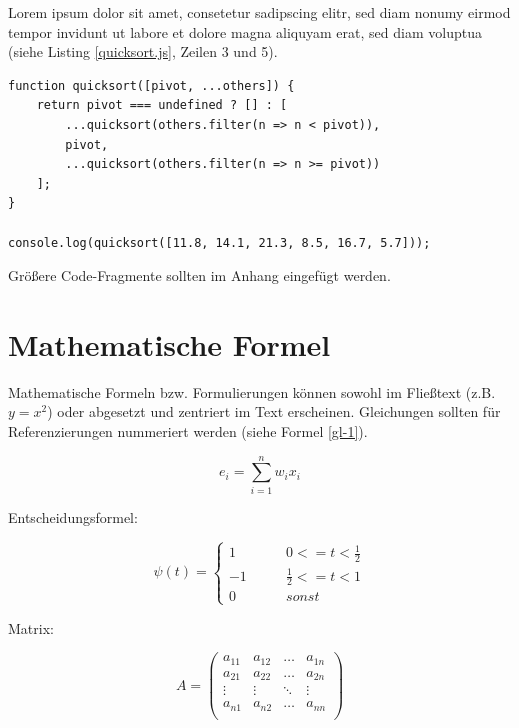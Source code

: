 Lorem ipsum dolor sit amet, consetetur sadipscing elitr, sed diam nonumy eirmod tempor invidunt ut labore et dolore magna aliquyam erat, sed diam voluptua (siehe Listing \ref{quicksort.js}, Zeilen 3 und 5).

\begin{lstlisting}[caption={Quicksort-Implementierung in JavaScript}, label={quicksort.js}]
function quicksort([pivot, ...others]) {
	return pivot === undefined ? [] : [
		...quicksort(others.filter(n => n < pivot)),
		pivot,
		...quicksort(others.filter(n => n >= pivot))
	];
}

console.log(quicksort([11.8, 14.1, 21.3, 8.5, 16.7, 5.7]));
\end{lstlisting}

Größere Code-Fragmente sollten im Anhang eingefügt werden. \cite{wiki:listing}

\section{Mathematische Formel}

Mathematische Formeln bzw. Formulierungen können sowohl im Fließtext (z.B. $y=x^2$) oder abgesetzt und zentriert im Text erscheinen. Gleichungen sollten für Referenzierungen nummeriert werden (siehe Formel \ref{gl-1}).

\begin{equation}
	\label{gl-1}
	e_{i}=\sum _{i=1}^{n}w_{i}x_{i}
\end{equation}

Entscheidungsformel:

\begin{equation}
	\psi(t)=\left\{\begin{array}{ccc}
		1 & \qquad 0 <= t < \frac{1}{2} \\
		-1 & \qquad \frac{1}{2} <= t <1 \\
		0 & \qquad sonst
	\end{array} \right.
\end{equation}

Matrix:

\begin{equation}
A = \left(
	\begin{array}{llll}
		a_{11} & a_{12} & \ldots & a_{1n} \\
		a_{21} & a_{22} & \ldots & a_{2n} \\
		\vdots & \vdots & \ddots & \vdots \\
		a_{n1} & a_{n2} & \ldots & a_{nn} \\
	\end{array}
\right)
\end{equation}

